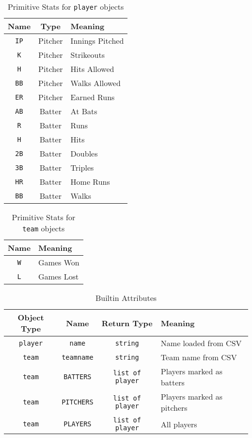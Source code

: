 \begin{table}[htdp]
\begin{center}
\begin{tabular}{|c|c|p{5cm}|}
\hline
Name & Type & Meaning\\
\hline
\texttt{IP} & Pitcher & Innings Pitched\\
\texttt{K} & Pitcher & Strikeouts\\
\texttt{H} & Pitcher & Hits Allowed\\
\texttt{BB} & Pitcher & Walks Allowed\\
\texttt{ER} & Pitcher & Earned Runs\\
\texttt{AB} & Batter & At Bats\\
\texttt{R} & Batter & Runs\\
\texttt{H} & Batter & Hits\\
\texttt{2B} & Batter & Doubles\\
\texttt{3B} & Batter & Triples\\
\texttt{HR} & Batter & Home Runs\\
\texttt{BB} & Batter & Walks\\
\hline
\end{tabular}
\end{center}
\caption{Primitive Stats for \texttt{player} objects}\label{playerstats}
\end{table}%

\begin{table}[htdp]
\begin{center}
\begin{tabular}{|c|p{5cm}|}
\hline
Name & Meaning\\
\hline
\texttt{W} & Games Won\\
\texttt{L} & Games Lost\\
\hline
\end{tabular}
\end{center}
\caption{Primitive Stats for \texttt{team} objects}\label{teamstats}
\end{table}%


\begin{table}[htdp]
\begin{center}
\begin{tabular}{|c|c|c|p{5cm}|}
\hline
Object Type & Name & Return Type & Meaning\\
\hline
\texttt{player} & \texttt{name} & \texttt{string} & Name loaded from CSV \\
\texttt{team} & \texttt{teamname} & \texttt{string} & Team name from
CSV \\
\texttt{team} & \texttt{BATTERS} & \texttt{list of player} & Players
marked as batters \\
\texttt{team} & \texttt{PITCHERS} & \texttt{list of player} & Players
marked as pitchers \\
\texttt{team} & \texttt{PLAYERS} & \texttt{list of player} & All
players \\
\hline
\end{tabular}
\end{center}
\caption{Builtin Attributes}\label{teamstats}
\end{table}%

